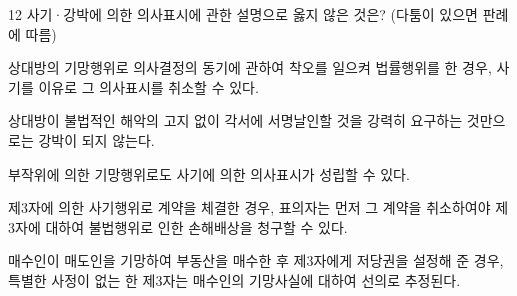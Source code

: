 \begin{question}{12}
사기·강박에 의한 의사표시에 관한 설명으로 옳지 않은 것은? (다툼이 있으면 판례에 따름)
\begin{choices}
  \item 상대방의 기망행위로 의사결정의 동기에 관하여 착오를 일으켜 법률행위를 한 경우, 사기를 이유로 그 의사표시를 취소할 수 있다.
  \item 상대방이 불법적인 해악의 고지 없이 각서에 서명날인할 것을 강력히 요구하는 것만으로는 강박이 되지 않는다.
  \item 부작위에 의한 기망행위로도 사기에 의한 의사표시가 성립할 수 있다.
  \item 제3자에 의한 사기행위로 계약을 체결한 경우, 표의자는 먼저 그 계약을 취소하여야 제3자에 대하여 불법행위로 인한 손해배상을 청구할 수 있다.
  \item 매수인이 매도인을 기망하여 부동산을 매수한 후 제3자에게 저당권을 설정해 준 경우, 특별한 사정이 없는 한 제3자는 매수인의 기망사실에 대하여 선의로 추정된다.
\end{choices}
\end{question}

